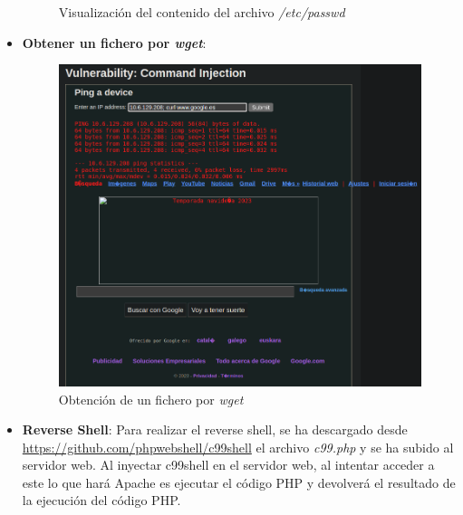 \documentclass[11pt]{report}
\begin{document}
\begin{itemize}
\begin{figure}[H]
          \caption{Visualización del contenido del archivo \emph{/etc/passwd}}
        \end{figure}
  \item \textbf{Obtener un fichero por \emph{wget}}:
        \begin{figure}[H]
          \centering
          \includegraphics[scale=0.28]{img/UbuntuServer/UbuntuServer_Base_6.png}
          \caption{Obtención de un fichero por \emph{wget}}
        \end{figure}
  \item \textbf{Reverse Shell}: Para realizar el reverse shell, se ha descargado desde \url{https://github.com/phpwebshell/c99shell}
        el archivo \emph{c99.php} y se ha subido al servidor web. Al inyectar c99shell en el servidor web, al intentar acceder a este
        lo que hará Apache es ejecutar el código PHP y devolverá el resultado de la ejecución del código PHP.
        \begin{figure}[H]
          \centering

\end{figure}
\end{itemize}
\end{document}
